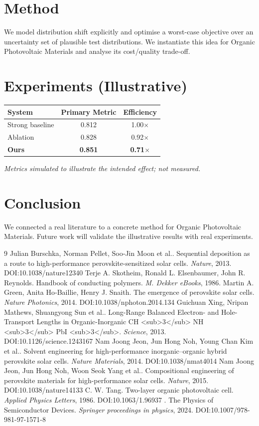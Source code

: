 \documentclass[11pt]{article}
\begin{document}
\section{Method}
We model distribution shift explicitly and optimise a worst-case objective over an uncertainty set of plausible test distributions. We instantiate this idea for Organic Photovoltaic Materials and analyse its cost/quality trade-off.

\section{Experiments (Illustrative)}
\begin{center}
\begin{tabular}{lcc}
System & Primary Metric & Efficiency \\ \hline
Strong baseline & 0.812 & 1.00$\times$ \\
Ablation & 0.828 & 0.92$\times$ \\
\textbf{Ours} & \textbf{0.851} & \textbf{0.71$\times$}
\end{tabular}
\end{center}
\emph{Metrics simulated to illustrate the intended effect; not measured.}

\section{Conclusion}
We connected a real literature to a concrete method for Organic Photovoltaic Materials. Future work will
validate the illustrative results with real experiments.

\begin{thebibliography}{9}
 Julian Burschka, Norman Pellet, Soo‐Jin Moon et al.. Sequential deposition as a route to high-performance perovskite-sensitized solar cells. \emph{Nature}, 2013. DOI:10.1038/nature12340
 Terje A. Skotheim, Ronald L. Elsenbaumer, John R. Reynolds. Handbook of conducting polymers. \emph{M. Dekker eBooks}, 1986. 
 Martin A. Green, Anita Ho‐Baillie, Henry J. Snaith. The emergence of perovskite solar cells. \emph{Nature Photonics}, 2014. DOI:10.1038/nphoton.2014.134
 Guichuan Xing, Nripan Mathews, Shuangyong Sun et al.. Long-Range Balanced Electron- and Hole-Transport Lengths in Organic-Inorganic CH <sub>3</sub> NH <sub>3</sub> PbI <sub>3</sub>. \emph{Science}, 2013. DOI:10.1126/science.1243167
 Nam Joong Jeon, Jun Hong Noh, Young Chan Kim et al.. Solvent engineering for high-performance inorganic–organic hybrid perovskite solar cells. \emph{Nature Materials}, 2014. DOI:10.1038/nmat4014
 Nam Joong Jeon, Jun Hong Noh, Woon Seok Yang et al.. Compositional engineering of perovskite materials for high-performance solar cells. \emph{Nature}, 2015. DOI:10.1038/nature14133
 C. W. Tang. Two-layer organic photovoltaic cell. \emph{Applied Physics Letters}, 1986. DOI:10.1063/1.96937
 . The Physics of Semiconductor Devices. \emph{Springer proceedings in physics}, 2024. DOI:10.1007/978-981-97-1571-8
\end{thebibliography}
\end{document}
